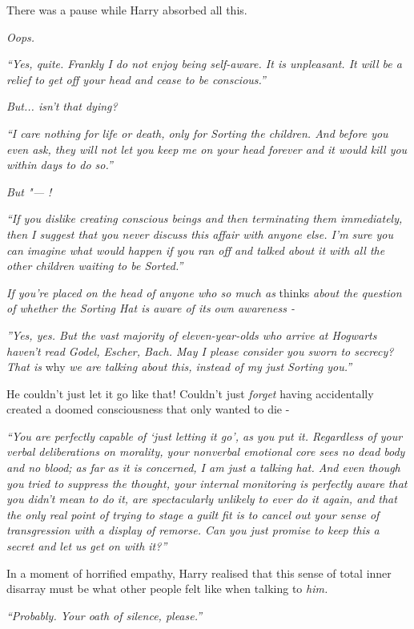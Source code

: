 There was a pause while Harry absorbed all this.

\emph{Oops.}

\emph{``Yes, quite. Frankly I do not enjoy being self-aware. It is
unpleasant. It will be a relief to get off your head and cease to be
conscious.''}

\emph{But... isn't that dying?}

\emph{``I care nothing for life or death, only for Sorting the children.
And before you even ask, they will not let you keep me on your head
forever and it would kill you within days to do so.''}

\emph{But "--- !}

\emph{``If you dislike creating conscious beings and then terminating
them immediately, then I suggest that you never discuss this affair with
anyone else. I'm sure you can imagine what would happen if you ran off
and talked about it with all the other children waiting to be Sorted.''}

\emph{If you're placed on the head of anyone who so much as} thinks
\emph{about the question of whether the Sorting Hat is aware of its own
awareness -}

\emph{''Yes, yes. But the vast majority of eleven-year-olds who arrive at
Hogwarts haven't read Godel, Escher, Bach. May I please consider you
sworn to secrecy? That is} why \emph{we are talking about this, instead
of my just Sorting you.''}

He couldn't just let it go like that! Couldn't just \emph{forget} having
accidentally created a doomed consciousness that only wanted to die -

\emph{``You are perfectly capable of `just letting it go', as you put
it. Regardless of your verbal deliberations on morality, your nonverbal
emotional core sees no dead body and no blood; as far as it is
concerned, I am just a talking hat. And even though you tried to
suppress the thought, your internal monitoring is perfectly aware that
you didn't mean to do it, are spectacularly unlikely to ever do it
again, and that the only real point of trying to stage a guilt fit is to
cancel out your sense of transgression with a display of remorse. Can
you just promise to keep this a secret and let us get on with it?''}

In a moment of horrified empathy, Harry realised that this sense of
total inner disarray must be what other people felt like when talking to
\emph{him.}

\emph{``Probably. Your oath of silence, please.''}

